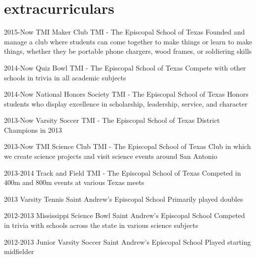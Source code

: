 \documentclass[]{friggeri-cv} %
\begin{document}
\section{extracurriculars}

\begin{entrylist}


\entry
{2015-Now}
{TMI Maker Club}
{TMI - The Episcopal School of Texas}
{Founded and manage a club where students can come together to make things or learn to make things, whether they be portable phone chargers, wood frames, or soldiering skills}


\entry
{2014-Now}
{Quiz Bowl}
{TMI - The Episcopal School of Texas}
{Compete with other schools in trivia in all academic subjects}


\entry
{2014-Now}
{National Honors Society}
{TMI - The Episcopal School of Texas}
{Honors students who display excellence in scholarship, leadership, service, and character}


\entry
{2013-Now}
{Varsity Soccer}
{TMI - The Episcopal School of Texas}
{District Champions in 2013}


\entry
{2013-Now}
{TMI Science Club}
{TMI - The Episcopal School of Texas}
{Club in which we create science projects and visit science events around San Antonio}


\entry
{2013-2014}
{Track and Field}
{TMI - The Episcopal School of Texas}
{Competed in 400m and 800m events at various Texas meets}


\entry
{2013}
{Varsity Tennis}
{Saint Andrew's Episcopal School}
{Primarily played doubles}


\entry
{2012-2013}
{Mississippi Science Bowl}
{Saint Andrew's Episcopal School}
{Competed in trivia with schools across the state in various science subjects}


\entry
{2012-2013}
{Junior Varsity Soccer}
{Saint Andrew's Episcopal School}
{Played starting midfielder}


\end{entrylist}
\end{document}
